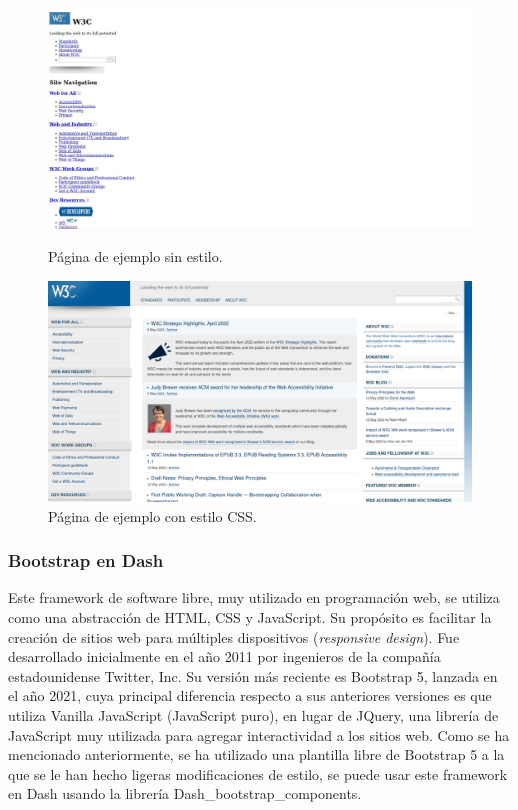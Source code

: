 \documentclass[a4paper, 12pt, oneside]{book}
\begin{document}
\begin{figure}[H]
  \centering
  \begin{minipage}[b]{0.4\textwidth}
    \includegraphics[width=\textwidth]{img/w3c_sin_css}
    \caption{Página de ejemplo sin estilo.}
    \label{figura:w3c_sin_css}
  \end{minipage}
  \hfill
  \begin{minipage}[b]{0.4\textwidth}
    \includegraphics[width=\textwidth]{img/w3c_con_css}
    \caption{Página de ejemplo con estilo CSS.}
    \label{figura:w3c_con_css}
  \end{minipage}
\end{figure}

\subsubsection{Bootstrap en Dash}
\label{subsubsec:boostrap}
Este framework de software libre, muy utilizado en programación web, se utiliza como una abstracción de HTML, CSS y JavaScript. Su propósito es facilitar la creación de sitios web para múltiples dispositivos (\textit{responsive design}). Fue desarrollado inicialmente en el año 2011 por ingenieros de la compañía estadounidense Twitter, Inc. Su versión más reciente es Bootstrap 5, lanzada en el año 2021, cuya principal diferencia respecto a sus anteriores versiones es que utiliza Vanilla JavaScript (JavaScript puro), en lugar de JQuery, una librería de JavaScript muy utilizada para agregar interactividad a los sitios web.
Como se ha mencionado anteriormente, se ha utilizado una plantilla libre de Bootstrap 5 a la que se le han hecho ligeras modificaciones de estilo, se puede usar este framework en Dash usando la librería Dash\_bootstrap\_components.
\end{document}
